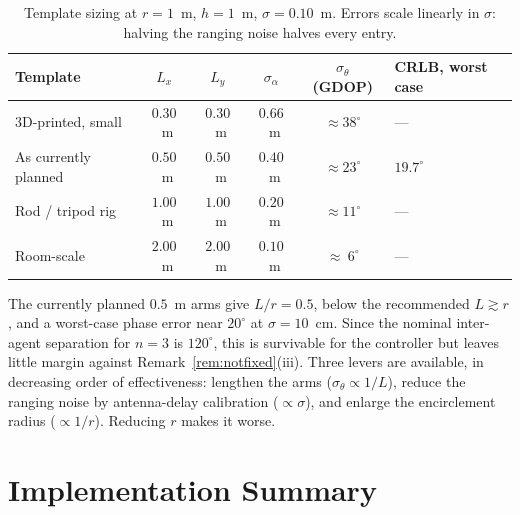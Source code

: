 \documentclass[11pt,a4paper]{article}
\begin{document}
\begin{table}[htbp]
\centering
\caption{Template sizing at $r=1$~m, $h=1$~m, $\sigma=0.10$~m. Errors scale
linearly in $\sigma$: halving the ranging noise halves every entry.}
\label{tab:sizing}
\begin{tabular}{lccccl}
\toprule
Template & $L_x$ & $L_y$ & $\sigma_\alpha$ & $\sigma_\theta$ (GDOP) & CRLB, worst case \\
\midrule
3D-printed, small  & $0.30$~m & $0.30$~m & $0.66$~m & $\approx 38^\circ$ & --- \\
As currently planned & $0.50$~m & $0.50$~m & $0.40$~m & $\approx 23^\circ$ & $19.7^\circ$ \\
Rod / tripod rig   & $1.00$~m & $1.00$~m & $0.20$~m & $\approx 11^\circ$ & --- \\
Room-scale         & $2.00$~m & $2.00$~m & $0.10$~m & $\approx \ 6^\circ$ & --- \\
\bottomrule
\end{tabular}
\end{table}

The currently planned $0.5$~m arms give $L/r = 0.5$, below the recommended
$L\gtrsim r$, and a worst-case phase error near $20^\circ$ at $\sigma=10$~cm.
Since the nominal inter-agent separation for $n=3$ is $120^\circ$, this is
survivable for the controller but leaves little margin against
Remark~\ref{rem:notfixed}(iii). Three levers are available, in decreasing order
of effectiveness: lengthen the arms ($\sigma_\theta \propto 1/L$), reduce the
ranging noise by antenna-delay calibration ($\propto\sigma$), and enlarge the
encirclement radius ($\propto 1/r$). Reducing $r$ makes it worse.

\section{Implementation Summary}
\end{document}
